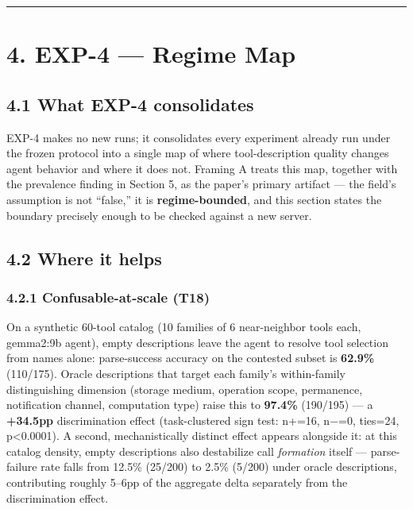 \begin{center}\rule{0.5\linewidth}{0.5pt}\end{center}

\hypertarget{exp-4-regime-map}{%
\section{4. EXP-4 --- Regime Map}\label{exp-4-regime-map}}

\hypertarget{what-exp-4-consolidates}{%
\subsection{4.1 What EXP-4 consolidates}\label{what-exp-4-consolidates}}

EXP-4 makes no new runs; it consolidates every experiment already run
under the frozen protocol into a single map of where tool-description
quality changes agent behavior and where it does not. Framing A treats
this map, together with the prevalence finding in Section 5, as the
paper's primary artifact --- the field's assumption is not ``false,'' it
is \textbf{regime-bounded}, and this section states the boundary
precisely enough to be checked against a new server.

\hypertarget{where-it-helps}{%
\subsection{4.2 Where it helps}\label{where-it-helps}}

\hypertarget{confusable-at-scale-t18}{%
\subsubsection{4.2.1 Confusable-at-scale
(T18)}\label{confusable-at-scale-t18}}

On a synthetic 60-tool catalog (10 families of 6 near-neighbor tools
each, gemma2:9b agent), empty descriptions leave the agent to resolve
tool selection from names alone: parse-success accuracy on the contested
subset is \textbf{62.9\%} (110/175). Oracle descriptions that target
each family's within-family distinguishing dimension (storage medium,
operation scope, permanence, notification channel, computation type)
raise this to \textbf{97.4\%} (190/195) --- a \textbf{+34.5pp}
discrimination effect (task-clustered sign test: n+=16, n−=0, ties=24,
p\textless0.0001). A second, mechanistically distinct effect appears
alongside it: at this catalog density, empty descriptions also
destabilize call \emph{formation} itself --- parse-failure rate falls
from 12.5\% (25/200) to 2.5\% (5/200) under oracle descriptions,
contributing roughly 5--6pp of the aggregate delta separately from the
discrimination effect.

